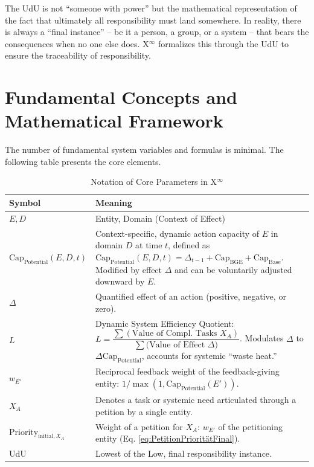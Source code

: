 \documentclass[12pt]{scrartcl}
\begin{document}
The UdU is not “someone with power” but the mathematical representation of the fact that ultimately all responsibility must land somewhere. In reality, there is always a “final instance” – be it a person, a group, or a system – that bears the consequences when no one else does. X$^\infty$ formalizes this through the UdU to ensure the traceability of responsibility.

\section{Fundamental Concepts and Mathematical Framework}
\label{sec:GrundbegriffeUndFramework}

The number of fundamental system variables and formulas is minimal. The following table presents the core elements.

\begin{table}[ht]
\centering
\caption{Notation of Core Parameters in X$^\infty$}
\begin{tabular}{p{3.0cm} >{\raggedright\arraybackslash}p{10.0cm}}
\toprule
Symbol & Meaning \\
\midrule
$E, D$ & Entity, Domain (Context of Effect) \\
$\text{Cap}_{\text{Potential}}(E,D,t)$ & Context-specific, dynamic action capacity of $E$ in domain $D$ at time $t$, defined as $\text{Cap}_{\text{Potential}}(E,D,t) = \Delta_{t-1} + \text{Cap}_{\text{BGE}} + \text{Cap}_{\text{Base}}$. Modified by effect $\Delta$ and can be voluntarily adjusted downward by $E$. \\
$\Delta$ & Quantified effect of an action (positive, negative, or zero). \\
$L$ & Dynamic System Efficiency Quotient: $L = \dfrac{\sum (\text{Value of Compl. Tasks } X_A)}{\sum (\text{Value of Effect } \Delta\text{)}}$. Modulates $\Delta$ to $\Delta\text{Cap}_{\text{Potential}}$, accounts for systemic “waste heat.” \\
$w_{E'}$ & Reciprocal feedback weight of the feedback-giving entity: $1 / \max(1, \text{Cap}_{\text{Potential}}(E'))$. \\
$X_A$ & Denotes a task or systemic need articulated through a petition by a single entity. \\
$\text{Priority}_{\text{initial}, X_A}$ & Weight of a petition for $X_A$: $w_{E'}$ of the petitioning entity (Eq. \eqref{eq:PetitionPrioritätFinal}). \\
UdU & Lowest of the Low, final responsibility instance. \\
\bottomrule
\end{tabular}
\end{table}
\end{document}
